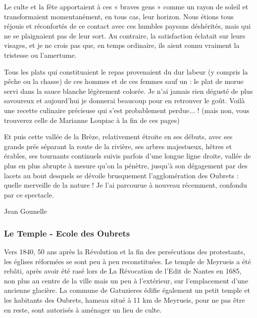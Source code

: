 Le culte et la fête apportaient à ces « braves gens » comme un rayon de soleil et
transformaient momentanément, en tous cas, leur horizon. Nous étions tous réjouis et
réconfortés de ce contact avec ces humbles paysans déshérités, mais qui ne se
plaignaient pas de leur sort. Au contraire, la satisfaction éclatait sur leurs visages, et
je ne crois pas que, en temps ordinaire, ils aient connu vraiment la tristesse ou
l’amertume.

Tous les plats qui constituaient le repas provenaient du dur labeur (y compris la pêche
ou la chasse) de ces hommes et de ces femmes sauf un : le plat de morue servi dans la
sauce blanche légèrement colorée. Je n’ai jamais rien dégusté de plus savoureux et
aujourd’hui je donnerai beaucoup pour en retrouver le goût. Voilà une recette
culinaire précieuse qui s’est probablement perdue... ! (mais non, vous trouverez celle de
Marianne Loupiac à la fin de ces pages)

Et puis cette vallée de la Brèze, relativement étroite en ses débuts, avec ses grands prés
séparant la route de la rivière, ses arbres majestueux, hêtres et érables, ses tournants
continuels suivis parfois d’une longue ligne droite, vallée de plus en plus abrupte à
mesure qu’on la pénètre, jusqu’à son dégagement par des lacets au bout desquels se
dévoile brusquement l’agglomération des Oubrets : quelle merveille de la nature ! Je
l’ai parcourue à nouveau récemment, confondu par ce spectacle.

\hfill Jean Gounelle



\subsubsection{Le Temple - Ecole des Oubrets}

Vers 1840, 50 ans après la Révolution et la fin des persécutions des protestants,
les églises réformées se sont peu à peu reconstituées. Le temple de Meyrueis a été
rebâti, après avoir été rasé lors de La Révocation de l’Edit de Nantes en 1685, non
plus au centre de la ville mais un peu à l’extérieur, sur l’emplacement d’une ancienne
glacière. La commune de Gatuzieres édifie également un petit temple et les habitants
des Oubrets, hameau situé à 11 km de Meyrueis, pour ne pas être en reste, sont
autorisés à aménager un lieu de culte.


